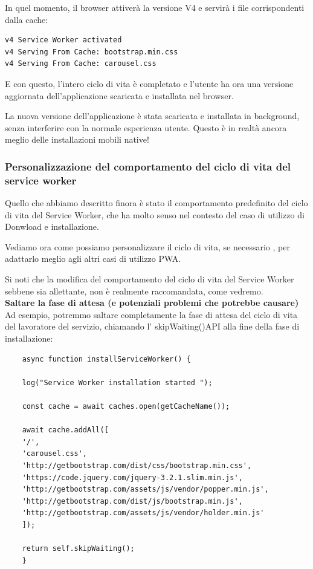 \documentclass[italian]{article}
\begin{document}
In quel momento, il browser attiverà la versione V4 e servirà i file corrispondenti dalla cache:
\begin{lstlisting}
v4 Service Worker activated
v4 Serving From Cache: bootstrap.min.css
v4 Serving From Cache: carousel.css
\end{lstlisting}
E con questo, l'intero ciclo di vita è completato e l'utente ha ora una versione aggiornata dell'applicazione scaricata e installata nel browser.

La nuova versione dell'applicazione è stata scaricata e installata in background, senza interferire con la normale esperienza utente. Questo è in realtà ancora meglio delle installazioni mobili native!

\subsubsection{Personalizzazione del comportamento del ciclo di vita del service worker}
Quello che abbiamo descritto finora è stato il comportamento predefinito del ciclo di vita del Service Worker, che ha molto senso nel contesto del caso di utilizzo di Donwload e installazione.

Vediamo ora come possiamo personalizzare il ciclo di vita, se necessario , per adattarlo meglio agli altri casi di utilizzo PWA.

Si noti che la modifica del comportamento del ciclo di vita del Service Worker sebbene sia allettante, non è realmente raccomandata, come vedremo.
\\
\textbf{Saltare la fase di attesa (e potenziali problemi che potrebbe causare)}
\\
Ad esempio, potremmo saltare completamente la fase di attesa del ciclo di vita del lavoratore del servizio, chiamando l' skipWaiting()API alla fine della fase di installazione:
\begin{lstlisting}
	async function installServiceWorker() {
	
	log("Service Worker installation started ");
	
	const cache = await caches.open(getCacheName());
	
	await cache.addAll([
	'/',
	'carousel.css',
	'http://getbootstrap.com/dist/css/bootstrap.min.css',
	'https://code.jquery.com/jquery-3.2.1.slim.min.js',
	'http://getbootstrap.com/assets/js/vendor/popper.min.js',
	'http://getbootstrap.com/dist/js/bootstrap.min.js',
	'http://getbootstrap.com/assets/js/vendor/holder.min.js'
	]);
	
	return self.skipWaiting();
	}
\end{lstlisting}
\end{document}
